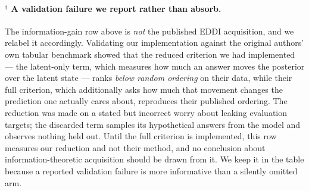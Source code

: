 \documentclass[11pt]{article}
\begin{document}
\paragraph{$^\dagger$ A validation failure we report rather than absorb.}
The information-gain row above is \emph{not} the published EDDI acquisition, and we relabel it
accordingly. Validating our implementation against the original authors' own tabular benchmark
showed that the reduced criterion we had implemented --- the latent-only term, which measures how
much an answer moves the posterior over the latent state --- ranks \emph{below random ordering} on
their data, while their full criterion, which additionally asks how much that movement changes the
prediction one actually cares about, reproduces their published ordering. The reduction was made on
a stated but incorrect worry about leaking evaluation targets; the discarded term samples its
hypothetical answers from the model and observes nothing held out. Until the full criterion is
implemented, this row measures our reduction and not their method, and no conclusion about
information-theoretic acquisition should be drawn from it. We keep it in the table because a
reported validation failure is more informative than a silently omitted arm.
\end{document}
